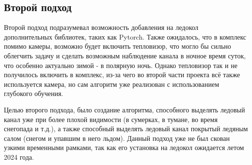 \subsection{Второй подход}
Второй подход подразумевал возможность добавления на ледокол дополнительных библиотек, таких как Pytorch. Также ожидалось, что в комплекс помимо камеры, 
возможно будет включить тепловизор, что могло бы сильно облегчить задачу и сделать возможным наблюдение канала в ночное время суток, что особенно актуально зимой 
- в полярную ночь. Однако тепловизор так и не получилось включить в комплекс, из-за чего во второй части проекта всё также используется камера, но сам алгоритм 
уже реализован с использованием глубокого обучения.

Целью второго подхода, было создание алгоритма, способного выделять ледовый канал уже при более плохой видимости (в сумерках, в тумане, во время снегопада и т.д.), 
а также способный выделять ледовый канал покрытый ледяным салом (снегом и упавшим в него льдом). Данный подход уже не был скован узкими временными рамками, так как 
его установка на ледокол ожидается летом 2024 года.

